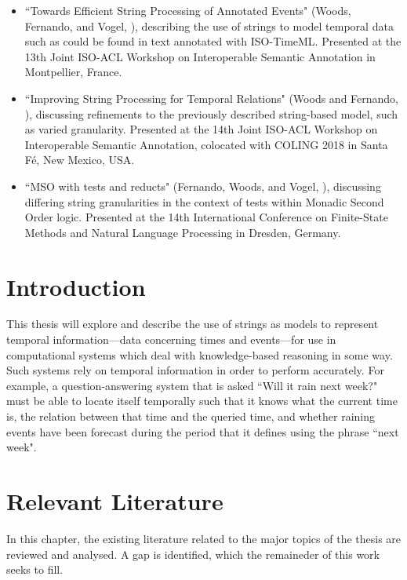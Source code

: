 \documentclass[a4paper,12pt,leqno]{article}
\begin{document}
\begin{itemize}
	\item ``Towards Efficient String Processing of Annotated Events" (Woods, Fernando, and Vogel, \citeyear{woods2017towards}), describing the use of strings to model temporal data such as could be found in text annotated with ISO-TimeML. Presented at the 13th Joint ISO-ACL Workshop on Interoperable Semantic Annotation in Montpellier, France.
	\item ``Improving String Processing for Temporal Relations" (Woods and Fernando, \citeyear{woods2018improving}), discussing refinements to the previously described string-based model, such as varied granularity. Presented at the 14th Joint ISO-ACL Workshop on Interoperable Semantic Annotation, colocated with COLING 2018 in Santa F\'{e}, New Mexico, USA.
	\item ``MSO with tests and reducts" (Fernando, Woods, and Vogel, \citeyear{fernando2019mso}), discussing differing string granularities in the context of tests within Monadic Second Order logic. Presented at the 14th International Conference on Finite-State Methods and Natural Language Processing in Dresden, Germany.
\end{itemize}
\newpage
\tableofcontents
\newpage
{}
\section{Introduction}\label{sec:intro}
This thesis will explore and describe the use of strings as models to represent temporal information---data concerning times and events---for use in computational systems which deal with knowledge-based reasoning in some way. Such systems rely on temporal information in order to perform accurately. For example, a question-answering system that is asked ``Will it rain next week?" must be able to locate itself temporally such that it knows what the current time is, the relation between that time and the queried time, and whether raining events have been forecast during the period that it defines using the phrase ``next week".
\newpage
\section{Relevant Literature}\label{sec:litreview}
In this chapter, the existing literature related to the major topics of the thesis are reviewed and analysed. A gap is identified, which the remaineder of this work seeks to fill.
\end{document}
